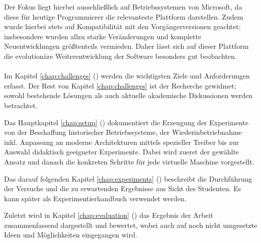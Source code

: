 		Der Fokus liegt hierbei ausschließlich auf Betriebssystemen von Microsoft, da diese für heutige Programmierer die relevanteste Plattform darstellen.
		Zudem wurde hierbei stets auf Kompatibilität mit den Vorgängerversionen geachtet;
		insbesondere wurden allzu starke Veränderungen und komplette Neuentwicklungen größtenteils vermieden. 
		Daher lässt sich auf dieser Plattform die evolutionäre Weiterentwicklung der Software besonders gut beobachten. \\ \\

	

				

		Im Kapitel \ref{chap:challenges} () werden die wichtigsten Ziele und Anforderungen erfasst. 
		Der Rest von Kapitel \ref{chap:challenges} ist der Recherche gewidmet; sowohl bestehende Lösungen als auch aktuelle akademische Diskussionen werden betrachtet.
		
		Das Hauptkapitel \ref{chap:setup} () dokumentiert die Erzeugung der Experimente von der Beschaffung historischer Betriebssysteme, der Wiederinbetriebnahme inkl. Anpassung an moderne Architekturen mittels spezieller Treiber bis zur Auswahl didaktisch geeigneter Experimente.
		Dabei wird zuerst der gewählte Ansatz und danach die konkreten Schritte für jede virtuelle Maschine vorgestellt.
		
		Das darauf folgenden Kapitel \ref{chap:experiments} () beschreibt die Durchführung der Versuche und die zu erwartenden Ergebnisse aus Sicht des Studenten. Es kann später als Experimentierhandbuch verwendet werden.

		Zuletzt wird in Kapitel \ref{chap:evaluation} () das Ergebnis der Arbeit zusammenfassend dargestellt und bewertet, wobei auch auf noch nicht umgesetzte Ideen und Möglichkeiten eingegangen wird.
		

